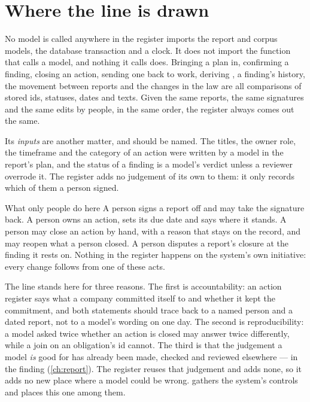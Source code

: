 \section{Where the line is drawn}\label{sec:register:line}

\begin{codebox}{No model is called anywhere in the register}
 imports the report and corpus models, the database transaction and
a clock. It does not import the function that calls a model, and nothing it calls does.
Bringing a plan in, confirming a finding, closing an action, sending one back to work,
deriving , a finding's history, the movement between reports and the changes in
the law are all comparisons of stored ids, statuses, dates and texts. Given the same reports,
the same signatures and the same edits by people, in the same order, the register always comes
out the same.

\smallskip
Its \emph{inputs} are another matter, and should be named. The titles, the owner role, the
timeframe and the category of an action were written by a model in the report's plan, and
the status of a finding is a model's verdict unless a reviewer overrode it. The register adds
no judgement of its own to them: it only records which of them a person signed.
\end{codebox}

\begin{humanbox}{What only people do here}
A person signs a report off and may take the signature back. A person owns an action, sets
its due date and says where it stands. A person may close an action by hand, with a reason
that stays on the record, and may reopen what a person closed. A person disputes a report's
closure at the finding it rests on. Nothing in the register happens on the system's own
initiative: every change follows from one of these acts.
\end{humanbox}

The line stands here for three reasons. The first is accountability: an action register says
what a company committed itself to and whether it kept the commitment, and both statements
should trace back to a named person and a dated report, not to a model's wording on one day.
The second is reproducibility: a model asked twice whether an action is closed may answer
twice differently, while a join on an obligation's id cannot. The third is that the judgement
a model \emph{is} good for has already been made, checked and reviewed elsewhere --- in the
finding (\cref{ch:report}). The register reuses that judgement and adds none, so it adds no
new place where a model could be wrong.  gathers the system's controls and
places this one among them.


